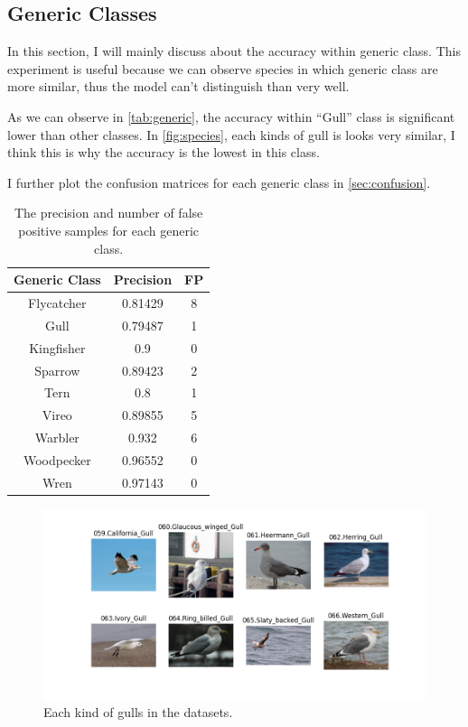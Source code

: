 \documentclass[twocolumn]{extarticle}
\begin{document}
\subsection{Generic Classes}

In this section, I will mainly discuss about the accuracy within generic class. This experiment is useful because we can observe species in which generic class are more similar, thus the model can't distinguish than very well.

As we can observe in \autoref{tab:generic}, the accuracy within ``Gull'' class is significant lower than other classes. In \autoref{fig:species}, each kinds of gull is looks very similar, I think this is why the accuracy is the lowest in this class.

I further plot the confusion matrices for each generic class in \autoref{sec:confusion}.


\begin{table}[H]
\centering
\caption{The precision and number of false positive samples for each generic class.}
\label{tab:generic}
\begin{tabular}{|c|c|c|}
\hline
\textbf{Generic Class} & \textbf{Precision} & \textbf{FP} \\ \hline
Flycatcher    & 0.81429   & 8  \\ \hline
Gull          & 0.79487   & 1  \\ \hline
Kingfisher    & 0.9       & 0  \\ \hline
Sparrow       & 0.89423   & 2  \\ \hline
Tern          & 0.8       & 1  \\ \hline
Vireo         & 0.89855   & 5  \\ \hline
Warbler       & 0.932     & 6  \\ \hline
Woodpecker    & 0.96552   & 0  \\ \hline
Wren          & 0.97143   & 0  \\ \hline
\end{tabular}
\end{table}

\begin{figure}[H]
\centering
\includegraphics[width=\linewidth]{figure/species}
\caption{Each kind of gulls in the datasets.}
\label{fig:species}
\end{figure}
\end{document}
